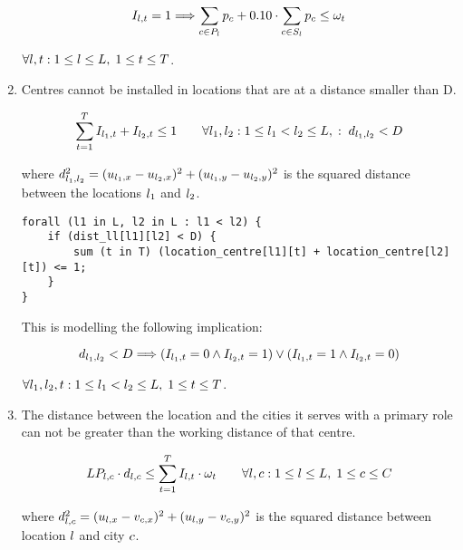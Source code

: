 \begin{enumerate}
    \[
    I_{l, t} = 1 \Longrightarrow
    \sum_{c \in P_l} p_c + 0.10 \cdot \sum_{c \in S_l} p_c
    \le
    \omega_{t}
    \]
    
    $\forall l, t: 1 \le l \le L,\; 1 \le t \le T$.
    
    \item Centres cannot be installed in locations that are at a distance smaller than D.
    
    \begin{equation}
    \sum_{t = 1}^{T} I_{l_1, t} + I_{l_2, t} \le 1
    \qquad
    \forall l_1, l_2:
    1 \le l_1 < l_2 \le L,\; : \;
    d_{l_1, l_2} < D
    \end{equation}
    
    where $d_{l_1, l_2}^2 =
    (u_{l_1, x} - u_{l_2, x})^2 + (u_{l_1, y} - u_{l_2, y})^2$ is the
    squared distance between the locations $l_1$ and $l_2$.
    
\begin{lstlisting}
forall (l1 in L, l2 in L : l1 < l2) {
	if (dist_ll[l1][l2] < D) {
		sum (t in T) (location_centre[l1][t] + location_centre[l2][t]) <= 1;
	}
}
\end{lstlisting}
    
    This is modelling the following implication:
    
    \[
    d_{l_1, l_2} < D \Longrightarrow
    (I_{l_1, t} = 0 \wedge I_{l_2, t} = 1) \vee
    (I_{l_1, t} = 1 \wedge I_{l_2, t} = 0)
    \]
    
    $\forall l_1, l_2, t:
    1 \le l_1 < l_2 \le L, \; 1 \le t \le T$.
    
    \item The distance between the location and the cities it serves with a primary role can not be
    greater than the working distance of that centre.
    
    \begin{equation}
    LP_{l, c} \cdot d_{l, c} \le
    \sum_{t = 1}^{T} I_{l, t} \cdot \omega_{t}
    \qquad
    \forall l, c:
    1 \le l \le L,\;
    1 \le c \le C
    \label{cstr:working-distance-primary}
    \end{equation}
    
    where $d_{l, c}^2 =
    (u_{l, x} - v_{c, x})^2 + (u_{l, y} - v_{c, y})^2$ is the squared distance
    between location $l$ and city $c$.
    

\end{enumerate}

